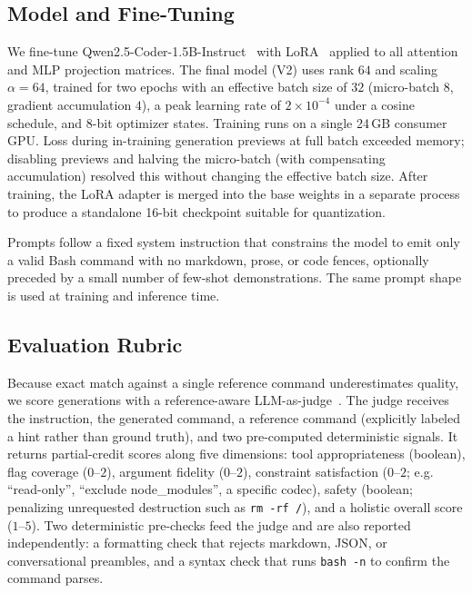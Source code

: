 \documentclass[conference]{IEEEtran}
\begin{document}
\subsection{Model and Fine-Tuning}

We fine-tune Qwen2.5-Coder-1.5B-Instruct~\cite{hui2024qwen25coder} with
LoRA~\cite{hu2022lora} applied to all attention and MLP projection matrices. The
final model (V2) uses rank $64$ and scaling $\alpha=64$, trained for two epochs
with an effective batch size of $32$ (micro-batch $8$, gradient accumulation
$4$), a peak learning rate of $2\times10^{-4}$ under a cosine schedule, and
8-bit optimizer states. Training runs on a single 24\,GB consumer GPU. Loss
during in-training generation previews at full batch exceeded memory; disabling
previews and halving the micro-batch (with compensating accumulation) resolved
this without changing the effective batch size. After training, the LoRA adapter
is merged into the base weights in a separate process to produce a standalone
16-bit checkpoint suitable for quantization.

Prompts follow a fixed system instruction that constrains the model to emit only
a valid Bash command with no markdown, prose, or code fences, optionally
preceded by a small number of few-shot demonstrations. The same prompt shape is
used at training and inference time.

\subsection{Evaluation Rubric}

Because exact match against a single reference command underestimates quality, we
score generations with a reference-aware LLM-as-judge~\cite{zheng2023judge}. The
judge receives the instruction, the generated command, a reference command
(explicitly labeled a hint rather than ground truth), and two pre-computed
deterministic signals. It returns partial-credit scores along five dimensions:
tool appropriateness (boolean), flag coverage ($0$--$2$), argument fidelity
($0$--$2$), constraint satisfaction ($0$--$2$; e.g. ``read-only'', ``exclude
node\_modules'', a specific codec), safety (boolean; penalizing unrequested
destruction such as \texttt{rm -rf /}), and a holistic overall score
($1$--$5$). Two deterministic pre-checks feed the judge and are also reported
independently: a formatting check that rejects markdown, JSON, or conversational
preambles, and a syntax check that runs \texttt{bash -n} to confirm the command
parses.
\end{document}
